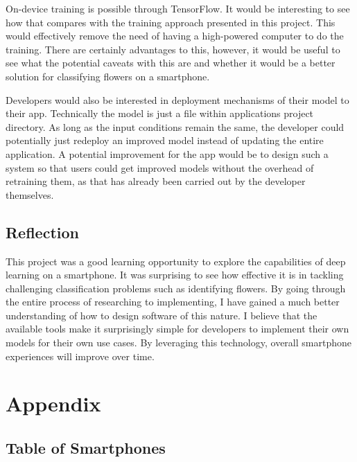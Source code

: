 \documentclass[12pt,a4paper]{report}
\begin{document}
\par

On-device training is possible through TensorFlow. It would be interesting to see how that compares with the training 
approach presented in this project. This would effectively remove the need of having a high-powered computer to do the 
training. There are certainly advantages to this, however, it would be useful to see what the potential caveats with 
this are and whether it would be a better solution for classifying flowers on a smartphone.

\par

Developers would also be interested in deployment mechanisms of their model to their app. Technically the model is just 
a file within applications project directory. As long as the input conditions remain the same, the developer could 
potentially just redeploy an improved model instead of updating the entire application. A potential improvement for the 
app would be to design such a system so that users could get improved models without the overhead of retraining them, as
that has already been carried out by the developer themselves.

\section{Reflection}

This project was a good learning opportunity to explore the capabilities of deep learning on a smartphone. It was 
surprising to see how effective it is in tackling challenging classification problems such as identifying flowers. 
By going through 
the entire process of researching to implementing, I have gained a much better understanding of how to design software 
of this nature. I believe that the available tools make it surprisingly simple for developers to implement their own 
models for their own use cases. By leveraging this technology, overall smartphone experiences will improve over time.

\clearpage


\clearpage

\appendix

\chapter{Appendix}

\section{Table of Smartphones}
\end{document}
